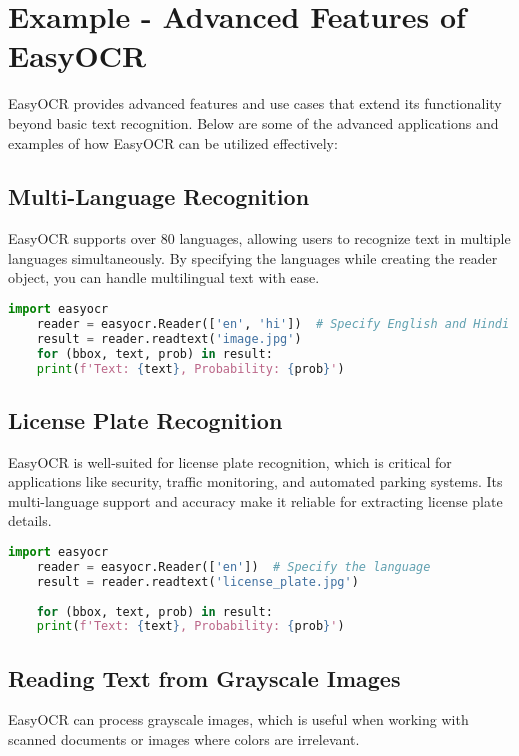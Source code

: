 \section{Example - Advanced Features of EasyOCR}

EasyOCR provides advanced features and use cases that extend its functionality beyond basic text recognition. Below are some of the advanced applications and examples of how EasyOCR can be utilized effectively:

\subsection{Multi-Language Recognition}
EasyOCR supports over 80 languages, allowing users to recognize text in multiple languages simultaneously. By specifying the languages while creating the reader object, you can handle multilingual text with ease.\cite{Mahajan:2023} 

\begin{lstlisting}[language=Python, caption=Multi-Language Recognition]
	import easyocr
	reader = easyocr.Reader(['en', 'hi'])  # Specify English and Hindi
	result = reader.readtext('image.jpg')
	for (bbox, text, prob) in result:
	print(f'Text: {text}, Probability: {prob}')
\end{lstlisting}

\subsection{License Plate Recognition}
EasyOCR is well-suited for license plate recognition, which is critical for applications like security, traffic monitoring, and automated parking systems. Its multi-language support and accuracy make it reliable for extracting license plate details.

\begin{lstlisting}[language=Python, caption=License Plate Recognition]
	import easyocr
	reader = easyocr.Reader(['en'])  # Specify the language
	result = reader.readtext('license_plate.jpg')
	
	for (bbox, text, prob) in result:
	print(f'Text: {text}, Probability: {prob}')
\end{lstlisting}

\subsection{Reading Text from Grayscale Images}
EasyOCR can process grayscale images, which is useful when working with scanned documents or images where colors are irrelevant.

